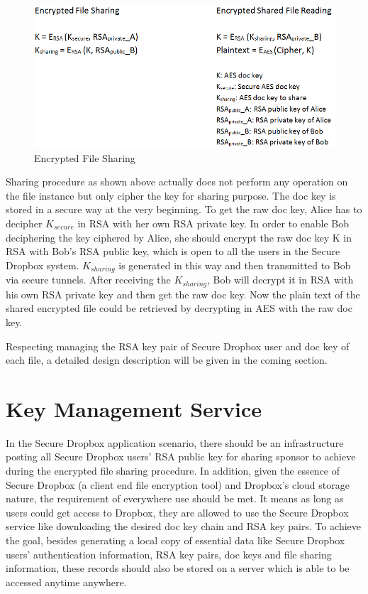 \begin{figure}[h]
        \centering
        \includegraphics[width=1.0\textwidth]{figures/Encrypted_File_Sharing.png}
        \caption[Encrypted File Sharing] {Encrypted File Sharing}
\end{figure}

Sharing procedure as shown above actually does not perform any operation on the file instance but only cipher the key for sharing purpose. The doc key is stored in a secure way at the very beginning. To get the raw doc key, Alice has to decipher $K_{secure}$ in RSA with her own RSA private key. In order to enable Bob deciphering the key ciphered by Alice, she should encrypt the raw doc key K in RSA with Bob’s RSA public key, which is open to all the users in the Secure Dropbox system. $K_{sharing}$ is generated in this way and then transmitted to Bob via secure tunnels. After receiving the $K_{sharing}$, Bob will decrypt it in RSA with his own RSA private key and then get the raw doc key. Now the plain text of the shared encrypted file could be retrieved by decrypting in AES with the raw doc key.

Respecting managing the RSA key pair of Secure Dropbox user and doc key of each file, a detailed design description will be given in the coming section.


\section{Key Management Service}

In the Secure Dropbox application scenario, there should be an infrastructure posting all Secure Dropbox users’ RSA public key for sharing sponsor to achieve during the encrypted file sharing procedure. In addition, given the essence of Secure Dropbox (a client end file encryption tool) and Dropbox’s cloud storage nature, the requirement of everywhere use should be met. It means as long as users could get access to Dropbox, they are allowed to use the Secure Dropbox service like downloading the desired doc key chain and RSA key pairs. To achieve the goal, besides generating a local copy of essential data like Secure Dropbox users’ authentication information, RSA key pairs, doc keys and file sharing information, these records should also be stored on a server which is able to be accessed anytime anywhere.


